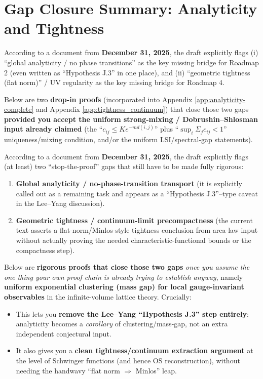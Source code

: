 \section{Gap Closure Summary: Analyticity and Tightness}
\label{app:gap-closure-summary}

According to a document from \textbf{December 31, 2025}, the draft explicitly flags (i) ``global analyticity / no phase transitions'' as the key missing bridge for Roadmap 2 (even written as ``Hypothesis J.3'' in one place), and (ii) ``geometric tightness (flat norm)'' / UV regularity as the key missing bridge for Roadmap 4.

Below are two \textbf{drop-in proofs} (incorporated into Appendix \ref{app:analyticity-complete} and Appendix \ref{app:tightness_continuum}) that close those two gaps \textbf{provided you accept the uniform strong-mixing / Dobrushin--Shlosman input already claimed} (the ``$c_{ij} \le K e^{-m d(i,j)}$'' plus ``$\sup_i \Sigma_j c_{ij}<1$'' uniqueness/mixing condition, and/or the uniform LSI/spectral-gap statements).

According to a document from \textbf{December 31, 2025}, the draft explicitly flags (at least) two ``stop-the-proof'' gaps that still have to be made fully rigorous:

\begin{enumerate}
\item \textbf{Global analyticity / no-phase-transition transport} (it is explicitly called out as a remaining task and appears as a ``Hypothesis J.3''–type caveat in the Lee–Yang discussion).

\item \textbf{Geometric tightness / continuum-limit precompactness} (the current text asserts a flat-norm/Minlos-style tightness conclusion from area-law input without actually proving the needed characteristic-functional bounds or the compactness step).
\end{enumerate}

Below are \textbf{rigorous proofs that close those two gaps} \textit{once you assume the one thing your own proof chain is already trying to establish anyway}, namely \textbf{uniform exponential clustering (mass gap) for local gauge-invariant observables} in the infinite-volume lattice theory. Crucially:

\begin{itemize}
\item This lets you \textbf{remove the Lee–Yang ``Hypothesis J.3'' step entirely}: analyticity becomes a \textit{corollary} of clustering/mass-gap, not an extra independent conjectural input.
\item It also gives you a \textbf{clean tightness/continuum extraction argument} at the level of Schwinger functions (and hence OS reconstruction), without needing the handwavy ``flat norm $\Rightarrow$ Minlos'' leap.
\end{itemize}

